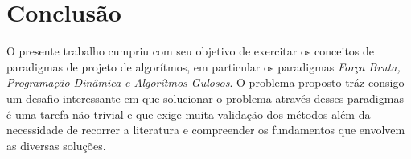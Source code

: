 \chapter{Conclusão}

O presente trabalho cumpriu com seu objetivo de exercitar os conceitos 
de paradigmas de projeto de algorítmos, em particular os paradigmas 
\emph{Força Bruta, Programação Dinâmica e Algorítmos Gulosos}. O 
problema proposto tráz consigo um desafio interessante em que 
solucionar o problema através desses paradigmas é uma tarefa não
trivial e que exige muita validação dos métodos além da necessidade
de recorrer a literatura e compreender os fundamentos que envolvem 
as diversas soluções. 
